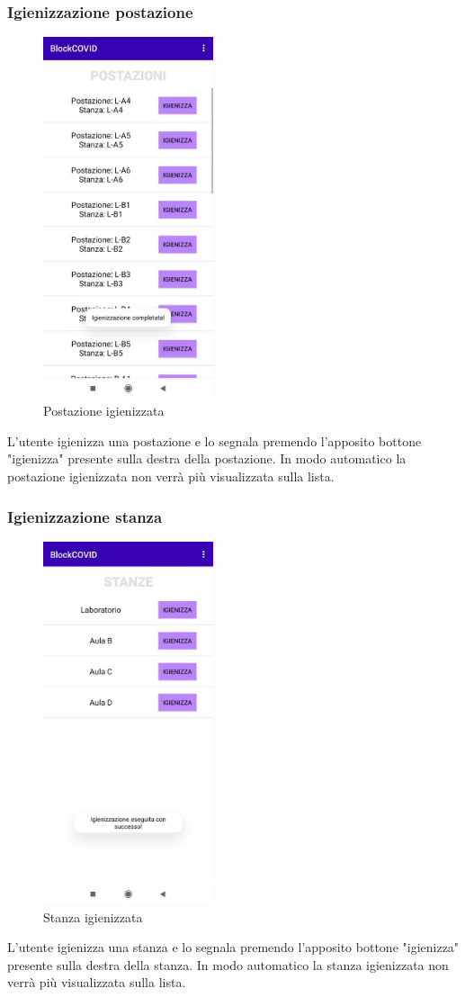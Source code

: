 	\subsubsection{Igienizzazione postazione}
	\begin{figure}[H]
		\centering
		\includegraphics[width=5cm]{res/images/igienizzazionePostazioniAddetto.png}
		\caption{Postazione igienizzata}
	\end{figure}
	L'utente igienizza una postazione e lo segnala premendo l'apposito bottone "igienizza" presente sulla destra della postazione. In modo automatico la postazione igienizzata non verrà più visualizzata sulla lista.
	
	\subsubsection{Igienizzazione stanza}
	\begin{figure}[H]
		\centering
		\includegraphics[width=5cm]{res/images/igienizzazioneStanza.png}
		\caption{Stanza igienizzata}
	\end{figure}
	L'utente igienizza una stanza e lo segnala premendo l'apposito bottone "igienizza" presente sulla destra della stanza. In modo automatico la stanza igienizzata non verrà più visualizzata sulla lista.
